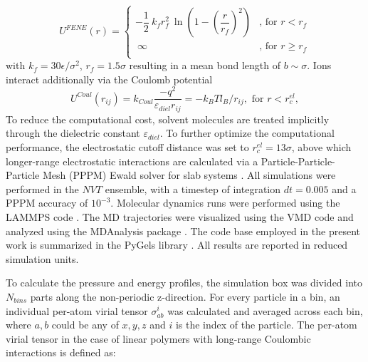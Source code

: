 \documentclass[twoside,twocolumn,9pt]{article}
\begin{document}
\begin{equation}\label{eq:fene_explain}
  U^{FENE}(r) =
  \begin{cases}
    - \dfrac{1}{2}\ k_f r_f^2 \  \ln \left( 1 -  \left(\dfrac{r}{r_f}\right)^2\right) & \text{, for $r<r_f$} \\
    \ \infty & \text{, for $r \geq r_f$} \\
  \end{cases}
\end{equation}
with $k_f =  30 \epsilon/\sigma^2$, $r_f = 1.5 \sigma $ resulting in a mean bond length of $b \sim \sigma$. Ions interact additionally via the Coulomb potential
\begin{equation}\label{eq:coul_explain}
    U^{Coul}(r_{ij}) = k_{Coul} \dfrac{-q^2}{\varepsilon_{diel} r_{ij}} = -k_BT l_B/r_{ij},\text{ for $r<r^{el}_c$},
\end{equation}
To reduce the computational cost, solvent molecules are treated implicitly through the dielectric constant $\varepsilon_{diel}$.  
To further optimize the computational performance, the electrostatic cutoff distance was set to $r^{el}_c = 13 \sigma$, above which longer-range electrostatic interactions are calculated via a Particle-Particle-Particle Mesh (PPPM) Ewald solver for slab systems \cite{Yeh_1999, Hockney_1988}.  All simulations were performed in the $NVT$ ensemble, with a timestep of integration $dt = 0.005$ and a PPPM accuracy of $10^{-3}$. Molecular dynamics runs were performed using the LAMMPS code \cite{Plimpton_1995}. The MD trajectories were visualized using the VMD code \cite{Humphrey_1996} and analyzed using the MDAnalysis package 
\cite{Khoshlessan_2017,Michaud_Agrawal_2011}. The code base employed in the present work is summarized in the PyGels library \cite{Vasilii2018}. All results are reported in reduced simulation units.

To calculate the pressure and energy profiles, the simulation box was divided into $N_{bins}$ parts along the non-periodic z-direction. For every particle in a bin, an individual per-atom virial tensor $\sigma_{ab}^i$ was calculated and averaged across each bin, where $a, b$ could be any of $x, y, z$ and $i$ is the index of the particle.  The per-atom virial tensor in the case of linear polymers with long-range Coulombic interactions is defined as:
\end{document}
